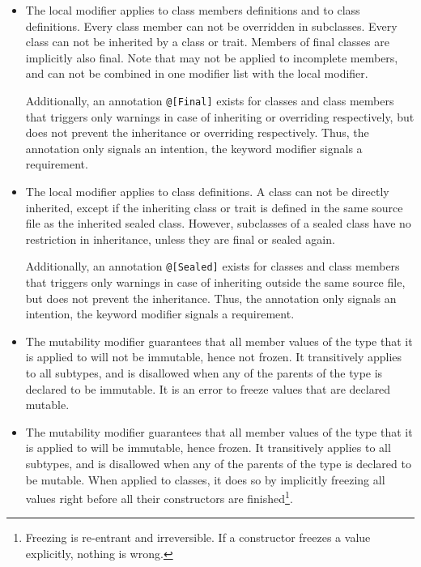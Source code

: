 \begin{itemize}
  \item The  local modifier applies to class members definitions and to class definitions. Every  class member can not be overridden in subclasses. Every  class can not be inherited by a class or trait. Members of final classes are implicitly also final. Note that  may not be applied to incomplete members, and can not be combined in one modifier list with the  local modifier. 

  Additionally, an annotation \lstinline!@[Final]! exists for classes and class members that triggers only warnings in case of inheriting or overriding respectively, but does not prevent the inheritance or overriding respectively. Thus, the annotation only signals an intention, the keyword modifier signals a requirement. 

  \item The  local modifier applies to class definitions. A  class can not be directly inherited, except if the inheriting class or trait is defined in the same source file as the inherited sealed class. However, subclasses of a sealed class have no restriction in inheritance, unless they are final or sealed again. 

  Additionally, an annotation \lstinline!@[Sealed]! exists for classes and class members that triggers only warnings in case of inheriting outside the same source file, but does not prevent the inheritance. Thus, the annotation only signals an intention, the keyword modifier signals a requirement. 
  
  \item The  mutability modifier guarantees that all member values of the type that it is applied to will not be immutable, hence not frozen. It transitively applies to all subtypes, and is disallowed when any of the parents of the type is declared to be immutable. It is an error to freeze values that are declared mutable. 
  
  \item The  mutability modifier guarantees that all member values of the type that it is applied to will be immutable, hence frozen. It transitively applies to all subtypes, and is disallowed when any of the parents of the type is declared to be mutable. When applied to classes, it does so by implicitly freezing all values right before all their constructors are finished\footnote{Freezing is re-entrant and irreversible. If a constructor freezes a value explicitly, nothing is wrong.}. 


\end{itemize}
